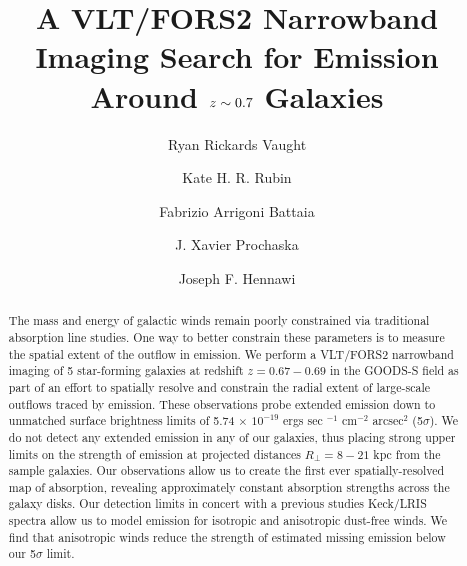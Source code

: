 \documentclass[twocolumn]{aastex61}
\begin{document}
\title{A VLT/FORS2 Narrowband Imaging Search for  Emission Around $\lowercase{z}\sim0.7$ Galaxies }
\author{Ryan Rickards Vaught}
 
 \author{Kate H. R. Rubin }
 
 \author{Fabrizio Arrigoni Battaia }

 \author{J. Xavier Prochaska}
 
\author{Joseph F. Hennawi}


\begin{abstract}

The mass and energy of galactic winds remain poorly constrained via traditional absorption line studies. One way to better constrain these parameters is to measure the spatial extent of the outflow in emission. We perform a VLT/FORS2 narrowband imaging of 5 star-forming galaxies at redshift $z=0.67-0.69$ in the GOODS-S field as part of an effort to spatially resolve and constrain the radial extent of large-scale outflows traced by  emission. These observations probe extended  emission down to unmatched surface brightness limits of 5.74 $\times$ $10^{-19}$ ergs sec $^{-1}$ cm$^{-2}$ arcsec$^2$ (5$\sigma$).  We do not detect any extended  emission in any of our galaxies, thus placing strong upper limits on the strength of  emission at projected distances $R_{\perp} = 8-21$ kpc from the sample galaxies. Our observations allow us to create the first ever spatially-resolved map of  absorption, revealing approximately constant absorption strengths across the galaxy disks. Our detection limits in concert with a previous studies Keck/LRIS spectra allow us to model  emission for isotropic and anisotropic dust-free winds. We find that anisotropic winds reduce the strength of estimated missing  emission below our 5$\sigma$ limit.

\end{abstract}
\end{document}
